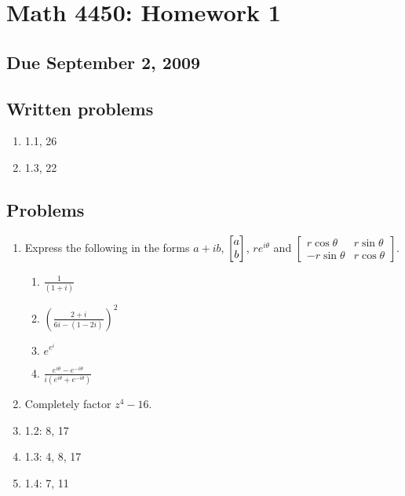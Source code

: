 \documentclass[11pt]{article}
\begin{document}
\section*{Math 4450:  Homework 1}
\subsection*{Due September 2, 2009}

\subsection*{Written problems}

\begin{enumerate}
\item 1.1, 26
\item 1.3,  22
\end{enumerate}

\subsection*{Problems}

\begin{enumerate}
\item Express the following in the forms $a+ib$, $\left[\begin{array}{@{}c@{}} a\\ b\end{array}\right]$, $re^{i\theta}$ and $\left[\begin{array}{cc} r\cos\theta & r\sin\theta\\ -r\sin\theta & r\cos\theta\end{array}\right]$.
\begin{enumerate}
\item $\frac{1}{(1+i)}$
\item $\left(\frac{2+i}{6i-(1-2i)}\right)^2$
\item $e^{e^i}$
\item $\frac{e^{i\theta}-e^{-i\theta}}{i(e^{i\theta}+e^{-i\theta})}$
\end{enumerate}
\item Completely factor $z^4-16$.
\item 1.2:  8, 17
\item 1.3: 4, 8, 17
\item  1.4: 7, 11
\end{enumerate}
\end{document}
